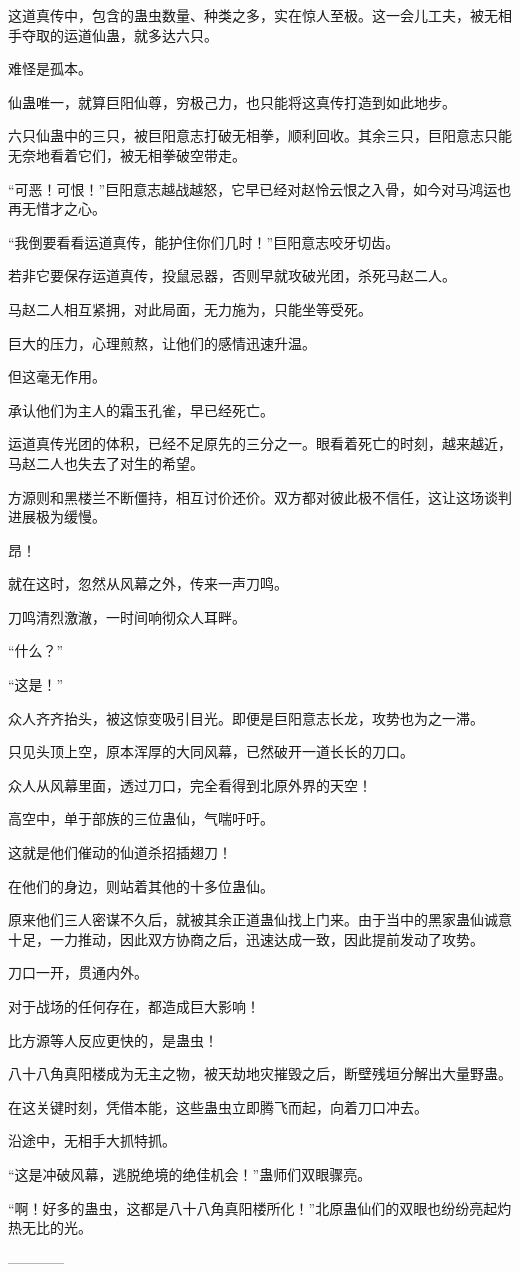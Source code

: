 \begin{this_body}
这道真传中，包含的蛊虫数量、种类之多，实在惊人至极。这一会儿工夫，被无相手夺取的运道仙蛊，就多达六只。

难怪是孤本。

仙蛊唯一，就算巨阳仙尊，穷极己力，也只能将这真传打造到如此地步。

六只仙蛊中的三只，被巨阳意志打破无相拳，顺利回收。其余三只，巨阳意志只能无奈地看着它们，被无相拳破空带走。

“可恶！可恨！”巨阳意志越战越怒，它早已经对赵怜云恨之入骨，如今对马鸿运也再无惜才之心。

“我倒要看看运道真传，能护住你们几时！”巨阳意志咬牙切齿。

若非它要保存运道真传，投鼠忌器，否则早就攻破光团，杀死马赵二人。

马赵二人相互紧拥，对此局面，无力施为，只能坐等受死。

巨大的压力，心理煎熬，让他们的感情迅速升温。

但这毫无作用。

承认他们为主人的霜玉孔雀，早已经死亡。

运道真传光团的体积，已经不足原先的三分之一。眼看着死亡的时刻，越来越近，马赵二人也失去了对生的希望。

方源则和黑楼兰不断僵持，相互讨价还价。双方都对彼此极不信任，这让这场谈判进展极为缓慢。

昂！

就在这时，忽然从风幕之外，传来一声刀鸣。

刀鸣清烈激澈，一时间响彻众人耳畔。

“什么？”

“这是！”

众人齐齐抬头，被这惊变吸引目光。即便是巨阳意志长龙，攻势也为之一滞。

只见头顶上空，原本浑厚的大同风幕，已然破开一道长长的刀口。

众人从风幕里面，透过刀口，完全看得到北原外界的天空！

高空中，单于部族的三位蛊仙，气喘吁吁。

这就是他们催动的仙道杀招插翅刀！

在他们的身边，则站着其他的十多位蛊仙。

原来他们三人密谋不久后，就被其余正道蛊仙找上门来。由于当中的黑家蛊仙诚意十足，一力推动，因此双方协商之后，迅速达成一致，因此提前发动了攻势。

刀口一开，贯通内外。

对于战场的任何存在，都造成巨大影响！

比方源等人反应更快的，是蛊虫！

八十八角真阳楼成为无主之物，被天劫地灾摧毁之后，断壁残垣分解出大量野蛊。

在这关键时刻，凭借本能，这些蛊虫立即腾飞而起，向着刀口冲去。

沿途中，无相手大抓特抓。

“这是冲破风幕，逃脱绝境的绝佳机会！”蛊师们双眼骤亮。

“啊！好多的蛊虫，这都是八十八角真阳楼所化！”北原蛊仙们的双眼也纷纷亮起灼热无比的光。

------------

\end{this_body}


